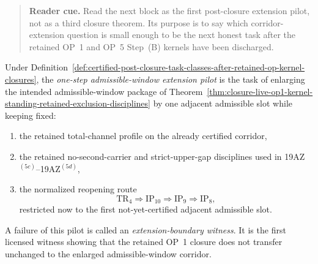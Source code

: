 \begin{quote}\small
\noindent\textbf{Reader cue.} Read the next block as the first post-closure extension pilot, not as a third closure theorem. Its purpose is to say which corridor-extension question is small enough to be the next honest task after the retained OP~1 and OP~5 Step~(B) kernels have been discharged.
\end{quote}

\begin{definition}
\label{def:one-step-admissible-window-extension-pilot-post-closure-op1-line}
Under Definition~\ref{def:certified-post-closure-task-classes-after-retained-op-kernel-closures}, the \emph{one-step admissible-window extension pilot} is the task of enlarging the intended admissible-window package of Theorem~\ref{thm:closure-live-op1-kernel-standing-retained-exclusion-disciplines} by one adjacent admissible slot while keeping fixed:
\begin{enumerate}[leftmargin=2em,label=(\roman*)]
 \item the retained total-channel profile on the already certified corridor,
 \item the retained no-second-carrier and strict-upper-gap disciplines used in 19AZ$^{(5c)}$--19AZ$^{(5d)}$,
 \item the normalized reopening route
 \[
 \mathrm{TR}_4 \Longrightarrow \mathrm{IP}_{10} \Longrightarrow \mathrm{IP}_9 \Longrightarrow \mathrm{IP}_8,
 \]
 restricted now to the first not-yet-certified adjacent admissible slot.
\end{enumerate}
A failure of this pilot is called an \emph{extension-boundary witness}. It is the first licensed witness showing that the retained OP~1 closure does not transfer unchanged to the enlarged admissible-window corridor.
\end{definition}


